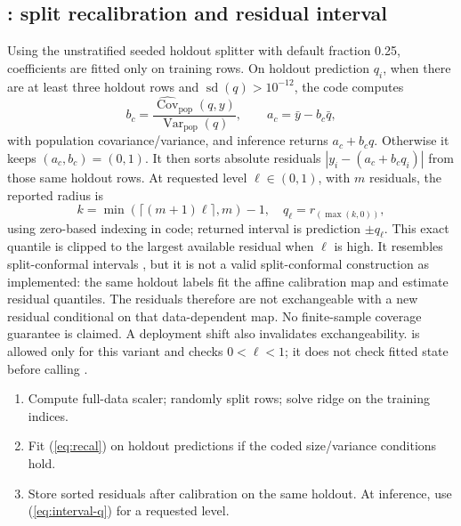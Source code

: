 \documentclass[conference]{IEEEtran}
\begin{document}
\subsection{: split recalibration and residual interval}
Using the unstratified seeded holdout splitter with default fraction 0.25, coefficients are fitted only on training rows. On holdout prediction \(q_i\), when there are at least three holdout rows and \(\operatorname{sd}(q)>10^{-12}\), the code computes
\begin{equation}
b_c=\frac{\widehat{\operatorname{Cov}}_{\mathrm{pop}}(q,y)}{\operatorname{Var}_{\mathrm{pop}}(q)},\qquad a_c=\bar y-b_c\bar q,
\label{eq:recal}
\end{equation}
with population covariance/variance, and inference returns \(a_c+b_cq\). Otherwise it keeps \((a_c,b_c)=(0,1)\). It then sorts absolute residuals \(|y_i-(a_c+b_cq_i)|\) from those same holdout rows. At requested level \(\ell\in(0,1)\), with \(m\) residuals, the reported radius is
\begin{equation}
k=\min(\lceil(m+1)\ell\rceil,m)-1,\quad
q_\ell=r_{(\max(k,0))},
\label{eq:interval-q}
\end{equation}
using zero-based indexing in code; returned interval is prediction \(\pm q_\ell\). This exact quantile is clipped to the largest available residual when \(\ell\) is high. It resembles split-conformal intervals \cite{vovk2005}, but it is not a valid split-conformal construction as implemented: the same holdout labels fit the affine calibration map and estimate residual quantiles. The residuals therefore are not exchangeable with a new residual conditional on that data-dependent map. No finite-sample coverage guarantee is claimed. A deployment shift also invalidates exchangeability.  is allowed only for this variant and checks \(0<\ell<1\); it does not check fitted state before calling .
\begin{enumerate}
\item Compute full-data scaler; randomly split rows; solve ridge on the training indices.
\item Fit (\ref{eq:recal}) on holdout predictions if the coded size/variance conditions hold.
\item Store sorted residuals after calibration on the same holdout. At inference, use (\ref{eq:interval-q}) for a requested level.
\end{enumerate}
\end{document}
